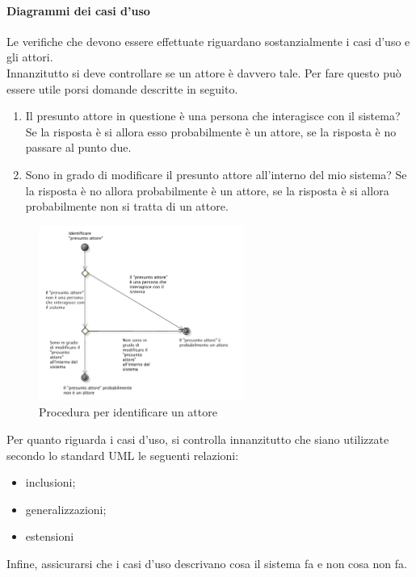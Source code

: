 			\paragraph{Diagrammi dei casi d'uso}
				Le verifiche che devono essere effettuate riguardano sostanzialmente i casi d'uso e gli attori.\\
				Innanzitutto si deve controllare se un attore è davvero tale. Per fare questo può essere utile porsi domande descritte in seguito.
				\begin{enumerate}
					\item Il presunto attore in questione è una persona che interagisce con il sistema? Se la risposta è si allora esso probabilmente 
					è un attore, se la risposta è no passare al punto due.
					\item Sono in grado di modificare il presunto attore all'interno del mio sistema? Se la risposta è no allora probabilmente è un attore, 
					se la risposta è si allora probabilmente non si tratta di un attore.
				\end{enumerate}
				\begin{figure}[H]
					\centering
					\includegraphics[width=0.6\textwidth]{NormeDiProgetto/Pics/VerificaAttori}
					\caption{Procedura per identificare un attore}
				\end{figure}
				Per quanto riguarda i casi d'uso, si controlla innanzitutto che siano utilizzate secondo lo standard UML le seguenti relazioni:
				\begin{itemize}
					\item inclusioni;
					\item generalizzazioni;
					\item estensioni
				\end{itemize}
				Infine, assicurarsi che i casi d'uso descrivano cosa il sistema fa e non cosa non fa.
